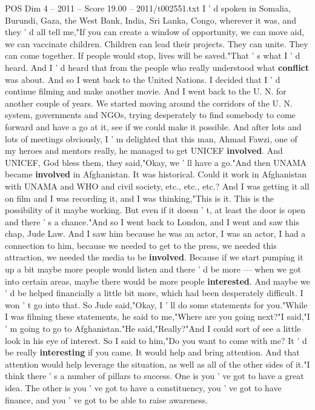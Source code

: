\begin{textsample}{POS Dim 4 – 2011 – Score 19.00 – 2011/t002551.txt}
I ' d spoken in Somalia, Burundi, Gaza, the West Bank, India, Sri Lanka, Congo, wherever it was, and they ' d all tell me,"If you can create a window of opportunity, we can move aid, we can vaccinate children.
Children can lead their projects.
They can unite.
They can come together.
If people would stop, lives will be saved."That ' s what I ' d heard.
And I ' d heard that from the people who really understood what \textbf{conflict} was about.
And so I went back to the United Nations.
I decided that I ' d continue filming and make another movie.
And I went back to the U.
N. for another couple of years.
We started moving around the corridors of the U.
N. system, governments and NGOs, trying desperately to find somebody to come forward and have a go at it, see if we could make it possible.
And after lots and lots of meetings obviously, I ' m delighted that this man, Ahmad Fawzi, one of my heroes and mentors really, he managed to get UNICEF \textbf{involved}.
And UNICEF, God bless them, they said,"Okay, we ' ll have a go."And then UNAMA became \textbf{involved} in Afghanistan.
It was historical.
Could it work in Afghanistan with UNAMA and WHO and civil society, etc., etc., etc.?
And I was getting it all on film and I was recording it, and I was thinking,"This is it.
This is the possibility of it maybe working.
But even if it doesn ' t, at least the door is open and there ' s a chance."And so I went back to London, and I went and saw this chap, Jude Law.
And I saw him because he was an actor, I was an actor, I had a connection to him, because we needed to get to the press, we needed this attraction, we needed the media to be \textbf{involved}.
Because if we start pumping it up a bit maybe more people would listen and there ' d be more — when we got into certain areas, maybe there would be more people \textbf{interested}.
And maybe we ' d be helped financially a little bit more, which had been desperately difficult.
I won ' t go into that.
So Jude said,"Okay, I ' ll do some statements for you."While I was filming these statements, he said to me,"Where are you going next?"I said,"I ' m going to go to Afghanistan."He said,"Really?"And I could sort of see a little look in his eye of interest.
So I said to him,"Do you want to come with me?
It ' d be really \textbf{interesting} if you came.
It would help and bring attention.
And that attention would help leverage the situation, as well as all of the other sides of it."I think there ' s a number of pillars to success.
One is you ' ve got to have a great idea.
The other is you ' ve got to have a constituency, you ' ve got to have finance, and you ' ve got to be able to raise awareness.

\end{textsample}
